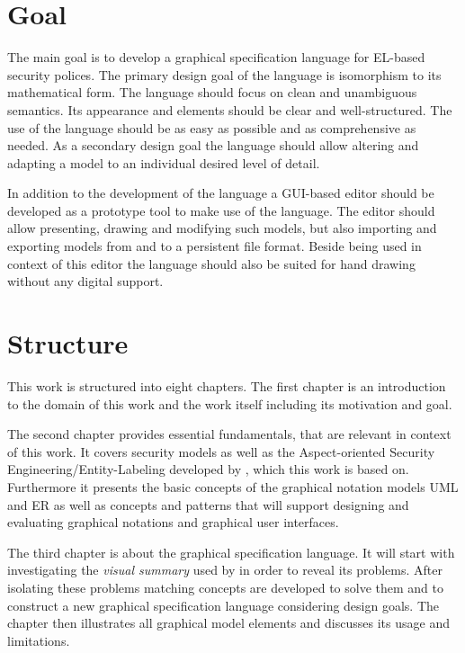 \documentclass[twoside, openright, 12pt]{book}
\begin{document}
\section{Goal} 
The main goal is to develop a graphical specification language for EL-based security polices.
The primary design goal of the language is isomorphism to its mathematical form.
The language should focus on clean and unambiguous semantics.
Its appearance and elements should be clear and well-structured.
The use of the language should be as easy as possible and as comprehensive as needed.
As a secondary design goal the language should allow altering and adapting a model to an individual desired level of detail.

In addition to the development of the language a GUI-based editor should be developed as a prototype tool to make use of the language.
The editor should allow presenting, drawing and modifying such models, but also importing and exporting models from and to a persistent file format.
Beside being used in context of this editor the language should also be suited for hand drawing without any digital support.




\section{Structure}
\label{structure}
This work is structured into eight chapters.
The first chapter is an introduction to the domain of this work and the work itself including its motivation and goal.

The second chapter provides essential fundamentals, that are relevant in context of this work.
It covers security models as well as the Aspect-oriented Security Engineering/Entity-Labeling developed by \cite{Amthor18}, which this work is based on.
Furthermore it presents the basic concepts of the graphical notation models UML and ER as well as concepts and patterns that will support designing and evaluating graphical notations and graphical user interfaces.

The third chapter is about the graphical specification language.
It will start with investigating the \textit{visual summary} used by \cite{Amthor18} in order to reveal its problems.
After isolating these problems matching concepts are developed to solve them and to construct a new graphical specification language considering design goals.
The chapter then illustrates all graphical model elements and discusses its usage and limitations.
\end{document}

